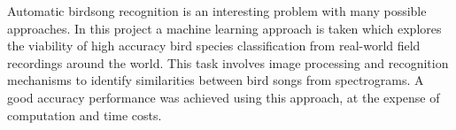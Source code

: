 Automatic birdsong recognition is an interesting problem with many possible approaches.
In this project a machine learning approach is taken which explores the viability of high accuracy
bird species classification from real-world field recordings around the world.
This task involves image processing and recognition mechanisms to identify
similarities between bird songs from spectrograms.
A good accuracy performance was achieved using this approach, at the expense of
computation and time costs.
